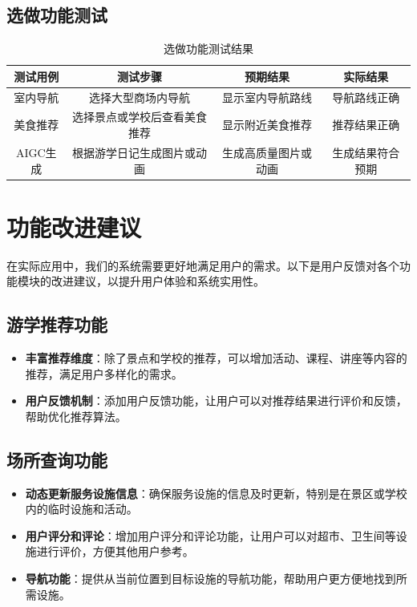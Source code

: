 \documentclass{ctexart}
\begin{document}
\subsection{选做功能测试}

\begin{table}[H]
    \centering
    \caption{选做功能测试结果}
    \begin{tabular}{|c|c|c|c|}
        \hline
        \textbf{测试用例} & \textbf{测试步骤}  & \textbf{预期结果} & \textbf{实际结果} \\ \hline
        室内导航          & 选择大型商场内导航      & 显示室内导航路线      & 导航路线正确        \\ \hline
        美食推荐          & 选择景点或学校后查看美食推荐 & 显示附近美食推荐      & 推荐结果正确        \\ \hline
        AIGC生成        & 根据游学日记生成图片或动画  & 生成高质量图片或动画    & 生成结果符合预期      \\ \hline
    \end{tabular}
\end{table}

\section{功能改进建议}

在实际应用中，我们的系统需要更好地满足用户的需求。以下是用户反馈对各个功能模块的改进建议，以提升用户体验和系统实用性。

\subsection{游学推荐功能}

\begin{itemize}
    \item \textbf{丰富推荐维度}：除了景点和学校的推荐，可以增加活动、课程、讲座等内容的推荐，满足用户多样化的需求。
    \item \textbf{用户反馈机制}：添加用户反馈功能，让用户可以对推荐结果进行评价和反馈，帮助优化推荐算法。
\end{itemize}

\subsection{场所查询功能}

\begin{itemize}
    \item \textbf{动态更新服务设施信息}：确保服务设施的信息及时更新，特别是在景区或学校内的临时设施和活动。
    \item \textbf{用户评分和评论}：增加用户评分和评论功能，让用户可以对超市、卫生间等设施进行评价，方便其他用户参考。
    \item \textbf{导航功能}：提供从当前位置到目标设施的导航功能，帮助用户更方便地找到所需设施。
\end{itemize}
\end{document}
